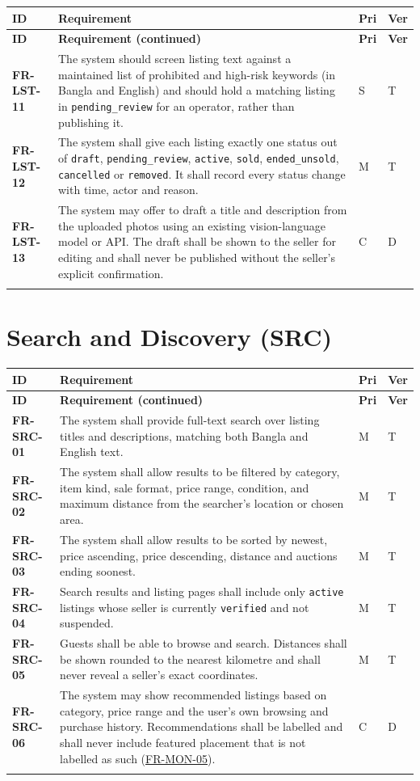 \documentclass[11pt,a4paper]{report}
\makeatletter
\newenvironment{reqs}{%
  \small
  \begin{longtable}{@{}>{\raggedright\arraybackslash}p{2.35cm}
                       >{\raggedright\arraybackslash}p{10.3cm}
                       >{\centering\arraybackslash}p{0.7cm}
                       >{\centering\arraybackslash}p{0.7cm}@{}}
  \toprule
  \textbf{ID} & \textbf{Requirement} & \textbf{Pri} & \textbf{Ver} \\
  \midrule
  \endfirsthead
  \toprule
  \textbf{ID} & \textbf{Requirement (continued)} & \textbf{Pri} & \textbf{Ver} \\
  \midrule
  \endhead
  \bottomrule
  \endfoot
}{\end{longtable}}
\newcommand{\req}[5]{\leavevmode\textbf{#1}\hypertarget{#1}{} & #5 & #2 & #3 \\ \addlinespace[2pt]}
\newcommand{\rr}[1]{\hyperlink{#1}{#1}}
\makeatother
\begin{document}
\begin{reqs}
\req{FR-LST-11}{S}{T}{new}{The system should screen listing text against a maintained list of prohibited and high-risk keywords (in Bangla and English) and should hold a matching listing in \texttt{pending\_review} for an operator, rather than publishing it.}
\req{FR-LST-12}{M}{T}{new}{The system shall give each listing exactly one status out of \texttt{draft}, \texttt{pending\_review}, \texttt{active}, \texttt{sold}, \texttt{ended\_unsold}, \texttt{cancelled} or \texttt{removed}. It shall record every status change with time, actor and reason.}
\req{FR-LST-13}{C}{D}{proposal AI}{The system may offer to draft a title and description from the uploaded photos using an existing vision-language model or API. The draft shall be shown to the seller for editing and shall never be published without the seller's explicit confirmation.}
\end{reqs}

\section{Search and Discovery (SRC)}
\begin{reqs}
\req{FR-SRC-01}{M}{T}{FR-19}{The system shall provide full-text search over listing titles and descriptions, matching both Bangla and English text.}
\req{FR-SRC-02}{M}{T}{FR-20}{The system shall allow results to be filtered by category, item kind, sale format, price range, condition, and maximum distance from the searcher's location or chosen area.}
\req{FR-SRC-03}{M}{T}{FR-21}{The system shall allow results to be sorted by newest, price ascending, price descending, distance and auctions ending soonest.}
\req{FR-SRC-04}{M}{T}{FR-22}{Search results and listing pages shall include only \texttt{active} listings whose seller is currently \texttt{verified} and not suspended.}
\req{FR-SRC-05}{M}{T}{new}{Guests shall be able to browse and search. Distances shall be shown rounded to the nearest kilometre and shall never reveal a seller's exact coordinates.}
\req{FR-SRC-06}{C}{D}{proposal AI}{The system may show recommended listings based on category, price range and the user's own browsing and purchase history. Recommendations shall be labelled and shall never include featured placement that is not labelled as such (\rr{FR-MON-05}).}
\end{reqs}
\end{document}

